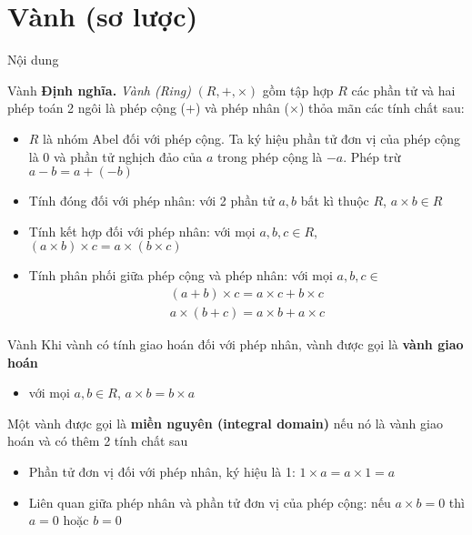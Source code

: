 \documentclass{beamer}
\begin{document}
\section{Vành (sơ lược)}
\begin{frame}{Nội dung}
    \tableofcontents[
        currentsection,
        sectionstyle=show/shaded,
        subsectionstyle=show/show/hide
    ]
\end{frame}
\begin{frame}{Vành}
    \textbf{Định nghĩa.} \textit{Vành (Ring)} $(R, +, \times)$ gồm tập hợp $R$ các phần tử và hai phép toán 2 ngôi là phép cộng ($+$) và phép nhân ($\times$) thỏa mãn các tính chất sau: \pause
    \begin{itemize}
        \item $R$ là nhóm Abel đối với phép cộng. Ta ký hiệu phần tử đơn vị của phép cộng là 0 và phần tử nghịch đảo của $a$ trong phép cộng là $-a$. Phép trừ $a - b = a + (-b)$
        \item Tính đóng đối với phép nhân: với 2 phần tử $a, b$ bất kì thuộc $R$, $a \times b \in R$
        \item Tính kết hợp đối với phép nhân: với mọi $a, b, c \in R$, $(a \times b) \times c = a \times (b \times c)$
        \item Tính phân phối giữa phép cộng và phép nhân: với mọi $a, b, c \in $
        \begin{align*}
            (a + b) \times c = a \times c + b \times c \\ a \times (b + c) = a \times b + a \times c
        \end{align*}
    \end{itemize}
\end{frame}

\begin{frame}{Vành}
    Khi vành có tính giao hoán đối với phép nhân, vành được gọi là \textbf{vành giao hoán}
    \begin{itemize}
        \item với mọi $a, b \in R$, $a \times b = b \times a$
    \end{itemize}
    \pause
    Một vành được gọi là \textbf{miền nguyên (integral domain)} nếu nó là vành giao hoán và có thêm 2 tính chất sau
    \begin{itemize}    
        \item Phần tử đơn vị đối với phép nhân, ký hiệu là 1: $1 \times a = a \times 1 = a$
        \item Liên quan giữa phép nhân và phần tử đơn vị của phép cộng: nếu $a \times b = 0$ thì $a = 0$ hoặc $b = 0$
    \end{itemize}
\end{frame}
\end{document}
